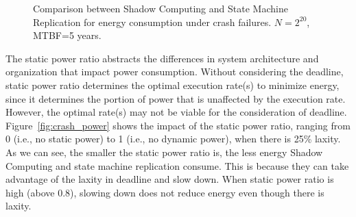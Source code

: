 \begin{figure}[!t]
	\begin{center}
	\end{center}
	\caption{Comparison between Shadow Computing and State Machine Replication for energy consumption under crash failures. $N=2^{20}$, MTBF=5 years.}
	\label{fig:crash_eval}
\end{figure}

The static power ratio abstracts the differences in system architecture and organization that impact power consumption. Without considering the deadline, static power ratio determines the optimal execution rate(s) to minimize energy, since it determines the portion of power that is unaffected by the execution rate. However, the optimal rate(s) may not be viable for the consideration of deadline. Figure~\ref{fig:crash_power} shows the impact of the static power ratio, ranging from 0 (i.e., no static power) to 1 (i.e., no dynamic power), when there is 25\% laxity. As we can see, the smaller the static power ratio is, the less energy Shadow Computing and state machine replication consume. This is because they can take advantage of the laxity in deadline and slow down. When static power ratio is high (above 0.8), slowing down does not reduce energy even though there is laxity. 

